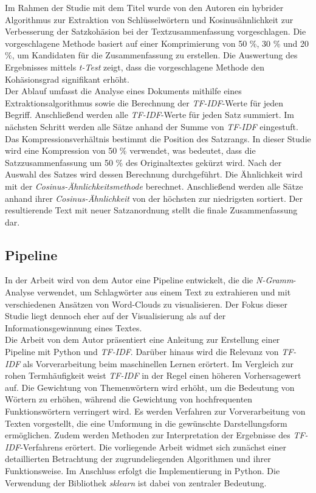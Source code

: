 Im Rahmen der Studie mit dem Titel \cite{darmawan2015hybrid} wurde von den Autoren \citeauthor{darmawan2015hybrid} ein hybrider Algorithmus zur Extraktion von Schlüsselwörtern und Kosinusähnlichkeit zur Verbesserung der Satzkohäsion bei der Textzusammenfassung vorgeschlagen. Die vorgeschlagene Methode basiert auf einer Komprimierung von 50 \%, 30 \% und 20 \%, um Kandidaten für die Zusammenfassung zu erstellen. Die Auswertung des Ergebnisses mittels \emph{t-Test} zeigt, dass die vorgeschlagene Methode den Kohäsionsgrad signifikant erhöht.\\
Der Ablauf umfasst die Analyse eines Dokuments mithilfe eines Extraktionsalgorithmus sowie die Berechnung der \emph{TF-IDF}-Werte für jeden Begriff. Anschließend werden alle \emph{TF-IDF}-Werte für jeden Satz summiert. Im nächsten Schritt werden alle Sätze anhand der Summe von \emph{TF-IDF} eingestuft. Das Kompressionsverhältnis bestimmt die Position des Satzrangs. In dieser Studie wird eine Kompression von 50 \% verwendet, was bedeutet, dass die Satzzusammenfassung um 50 \% des Originaltextes gekürzt wird. Nach der Auswahl des Satzes wird dessen Berechnung durchgeführt. Die Ähnlichkeit wird mit der \emph{Cosinus-Ähnlichkeitsmethode} berechnet. Anschließend werden alle Sätze anhand ihrer \emph{Cosinus-Ähnlichkeit} von der höchsten zur niedrigsten sortiert. Der resultierende Text mit neuer Satzanordnung stellt die finale Zusammenfassung dar.\\

\subsection*{Pipeline}
In der Arbeit  \cite{pirk2019implementierung} wird von dem Autor \citeauthor{pirk2019implementierung} eine Pipeline entwickelt, die die \emph{N-Gramm}-Analyse verwendet, um Schlagwörter aus einem Text zu extrahieren und mit verschiedenen Ansätzen von Word-Clouds zu visualisieren. Der Fokus dieser Studie liegt dennoch eher auf der Visualisierung als auf der Informationsgewinnung eines Textes.\\

Die Arbeit \cite{lavin2019analyzing} von dem Autor \citeauthor{lavin2019analyzing} präsentiert eine Anleitung zur Erstellung einer Pipeline mit Python und \emph{TF-IDF}. Darüber hinaus wird die Relevanz von \emph{TF-IDF} als Vorverarbeitung beim maschinellen Lernen erörtert. Im Vergleich zur rohen Termhäufigkeit weist \emph{TF-IDF} in der Regel einen höheren Vorhersagewert auf. Die Gewichtung von Themenwörtern wird erhöht, um die Bedeutung von Wörtern zu erhöhen, während die Gewichtung von hochfrequenten Funktionswörtern verringert wird. Es werden Verfahren zur Vorverarbeitung von Texten vorgestellt, die eine Umformung in die gewünschte Darstellungsform ermöglichen. Zudem werden Methoden zur Interpretation der Ergebnisse des \emph{TF-IDF}-Verfahrens erörtert. Die vorliegende Arbeit widmet sich zunächst einer detaillierten Betrachtung der zugrundeliegenden Algorithmen und ihrer Funktionsweise. Im Anschluss erfolgt die Implementierung in Python. Die Verwendung der Bibliothek \emph{sklearn} ist dabei von zentraler Bedeutung.\\

